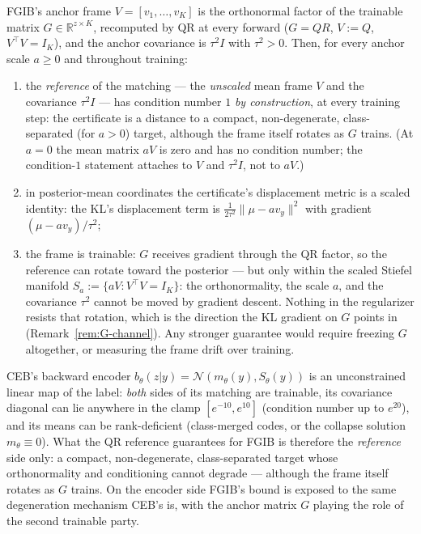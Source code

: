 \begin{proposition}\label{prop:conditioning}
FGIB's anchor frame $V = [v_1, \dots, v_K]$ is the orthonormal factor of the trainable
matrix $G \in \mathbb{R}^{z \times K}$, recomputed by QR at every forward
($G = QR$, $V := Q$, $V^{\top}V = I_K$), and the anchor covariance is
$\tau^2 I$ with $\tau^2 > 0$.
Then, for every anchor scale $a \ge 0$ and throughout training:
\begin{enumerate}
\item[(i)] the \emph{reference} of the matching --- the \emph{unscaled} mean frame $V$
and the covariance $\tau^2 I$ --- has condition number $1$ \emph{by construction}, at
every training step: the certificate is a distance to a compact, non-degenerate,
class-separated (for $a > 0$) target, although the frame itself rotates as $G$ trains.
(At $a = 0$ the mean matrix $a V$ is zero and has no condition number; the
condition-$1$ statement attaches to $V$ and $\tau^2 I$, not to $a V$.)
\item[(ii)] in posterior-mean coordinates the certificate's displacement metric is a
scaled identity: the KL's displacement term is $\tfrac{1}{2\tau^2}\|\mu - a v_y\|^2$
with gradient $(\mu - a v_y)/\tau^2$;
\item[(iii)] the frame is trainable: $G$ receives gradient through the QR factor, so
the reference can rotate toward the posterior --- but only within the scaled Stiefel
manifold $S_a := \{aV : V^{\top}V = I_K\}$: the orthonormality, the scale $a$, and the
covariance $\tau^2$ cannot be moved by gradient descent. Nothing in the regularizer
resists that rotation, which is the direction the KL gradient on $G$ points in
(Remark~\ref{rem:G-channel}). Any stronger guarantee would require freezing $G$
altogether, or measuring the frame drift over training.
\end{enumerate}
CEB's backward encoder $b_\theta(z|y) = \mathcal{N}(m_\theta(y), S_\theta(y))$ is an
unconstrained linear map of the label: \emph{both} sides of its matching are trainable,
its covariance diagonal can lie anywhere in the clamp $[e^{-10}, e^{10}]$ (condition
number up to $e^{20}$), and its means can be rank-deficient (class-merged codes, or the
collapse solution $m_\theta \equiv 0$). What the QR reference guarantees for FGIB is
therefore the \emph{reference} side only: a compact, non-degenerate, class-separated
target whose orthonormality and conditioning cannot degrade --- although the frame
itself rotates as $G$ trains. On the encoder side FGIB's bound is exposed to the same
degeneration mechanism CEB's is, with the anchor matrix $G$ playing the role of the
second trainable party.
\end{proposition}

